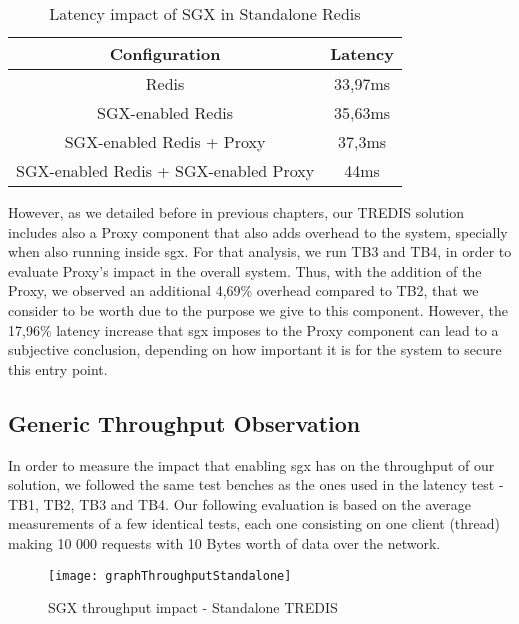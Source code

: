 \begin{table}[ht]
	\caption{Latency impact of SGX in Standalone Redis} %
	\centering %
	\begin{tabular}{c c} %
		\hline\hline %
		\textbf{Configuration} & \textbf{Latency} \\ [0.5ex] %
		\hline
		Redis & 33,97ms\\
		\hline
		SGX-enabled Redis & 35,63ms \\
		\hline
	    SGX-enabled Redis + Proxy & 37,3ms \\
		\hline %
	    SGX-enabled Redis + SGX-enabled Proxy & 44ms\\ [1ex] %
		\hline %
	\end{tabular}
	\label{table:latencySingleRedis} %
\end{table}

However, as we detailed before in previous chapters, our TREDIS solution includes also a Proxy component that also adds overhead to the system, specially when also running inside \gls{sgx}. For that analysis, we run TB3 and TB4, in order to evaluate Proxy's impact in the overall system. Thus, with the addition of the Proxy, we observed an additional 4,69\% overhead compared to TB2, that we consider to be worth due to the purpose we give to this component. However, the 17,96\% latency increase that \gls{sgx} imposes to the Proxy component can lead to a subjective conclusion, depending on how important it is for the system to secure this entry point.

\subsection{Generic Throughput Observation}

In order to measure the impact that enabling \gls{sgx} has on the throughput of our solution, we followed the same test benches as the ones used in the latency test - TB1, TB2, TB3 and TB4. Our following evaluation is based on the average measurements of a few identical tests, each one consisting on one client (thread) making 10 000 requests with 10 Bytes worth of data over the network.

\begin{figure}[htbp]
	\centering
	{\texttt{[image: graphThroughputStandalone]}}
	\caption{SGX throughput impact - Standalone TREDIS}
	\label{fig:graphThroughputStandalone}
\end{figure}

